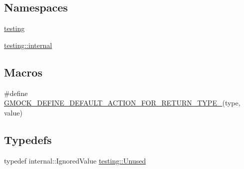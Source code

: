 \subsection*{Namespaces}
\begin{DoxyCompactItemize}
\item 
 \mbox{\hyperlink{namespacetesting}{testing}}
\item 
 \mbox{\hyperlink{namespacetesting_1_1internal}{testing\+::internal}}
\end{DoxyCompactItemize}
\subsection*{Macros}
\begin{DoxyCompactItemize}
\item 
\#define \mbox{\hyperlink{gmock-actions_8h_a06b1e6cd1145acf7849e4a112976016b}{G\+M\+O\+C\+K\+\_\+\+D\+E\+F\+I\+N\+E\+\_\+\+D\+E\+F\+A\+U\+L\+T\+\_\+\+A\+C\+T\+I\+O\+N\+\_\+\+F\+O\+R\+\_\+\+R\+E\+T\+U\+R\+N\+\_\+\+T\+Y\+P\+E\+\_\+}}(type,  value)
\end{DoxyCompactItemize}
\subsection*{Typedefs}
\begin{DoxyCompactItemize}
\item 
typedef internal\+::\+Ignored\+Value \mbox{\hyperlink{namespacetesting_a603e329ec0263ebfcf16f712810bd511}{testing\+::\+Unused}}
\end{DoxyCompactItemize}
